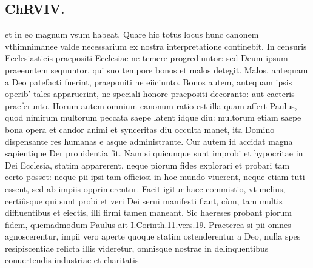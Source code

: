 \documentclass{article}
\begin{document}
\begin{pages}
\section*{ChRVIV. }
\marginpar{[ p.385 ]}\pstart et in eo magnum vsum habeat. Quare hic totus locus hunc canonem vthimnimanee valde necessarium ex nostra interpretatione continebit.  \pend\pstart In censuris Ecclesiasticis praepositi Ecclesiae ne temere progrediuntor: sed Deum ipsum praeeuntem sequuntor, qui suo tempore bonos et malos detegit.  \pend\pstart Malos, antequam a Deo patefacti fuerint, praepouiti ne eiiciunto. Bonos autem, antequam ipsis operib' tales apparuerint, ne speciali honore praepositi decoranto: aut caeteris praeferunto.  \pend\pstart Horum autem omnium canonum ratio est illa quam affert Paulus, quod nimirum multorum peccata saepe latent idque diu: multorum etiam saepe bona opera et candor animi et synceritas diu occulta manet, ita Domino dispensante res humanas e asque administrante.   \pend\pstart Cur autem id accidat magna sapientique Der prouidentia fit. Nam si quicunque sunt improbi et hypocritae in Dei Ecclesia, statim apparerent, neque piorum fides explorari et probari tam certo posset: neque pii ipsi tam officiosi in hoc mundo viuerent, neque etiam tuti essent, sed ab impiis opprimerentur. Facit igitur haec commistio, vt melius, certiûsque qui sunt probi et veri Dei serui manifesti fiant, cùm, tam multis diffluentibus et eiectis, illi firmi tamen maneant. Sic haereses probant piorum fidem, quemadmodum Paulus ait I.Corinth.11.vers.19. Praeterea si pii omnes agnoscerentur, impii vero aperte quoque statim ostenderentur a Deo, nulla spes resipiscentiae relicta illis videretur, omnisque nostrae in delinquentibus conuertendis industriae et charitatis  \pend

\end{pages}
\end{document}
